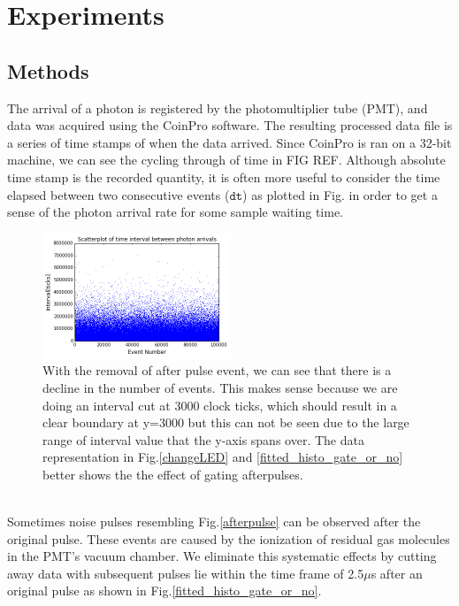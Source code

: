 \documentclass[authoryear, 12pt,5p, Times]{elsarticle}
\begin{document}
\section{Experiments\label{experiment}}
	\subsection{Methods}
\indent The arrival of a photon is registered by the photomultiplier tube (PMT), and data was acquired using the CoinPro software. The resulting processed data file is a series of time stamps of when the data arrived. Since CoinPro is ran on a 32-bit machine, we can see the cycling through of time in FIG REF. Although absolute time stamp is the recorded quantity, it is often more useful to consider the time elapsed between two consecutive events ($\texttt{dt}$) as plotted in Fig. in order to get a sense of  the photon arrival rate for some sample waiting time.
\begin{figure}[h]
\centering
\includegraphics[width=0.5\textwidth]{figures/interval_scatterplot}
\caption{With the removal of after pulse event, we can see that there is a decline in the number of events. This makes sense because we are doing an interval cut at 3000 clock ticks, which should result in a clear boundary at y=3000 but this can not be seen due to the large range of interval value that the y-axis spans over. The data representation in Fig.\ref{changeLED} and \ref{fitted_histo_gate_or_no} better shows the the effect of gating afterpulses. }
\label{scatterplot}
\end{figure}
\\
\indent Sometimes noise pulses resembling Fig.\ref{afterpulse} can be observed after the original pulse. These events are caused by  the ionization of residual gas molecules in the PMT's vacuum chamber.  We eliminate this systematic effects by cutting away data with subsequent pulses lie within the time frame of 2.5$\mu$s  after an original pulse as shown in Fig.\ref{fitted_histo_gate_or_no}.
\end{document}
